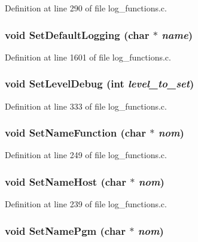 Definition at line 290 of file log\_\-functions.c.
\subsubsection[{SetDefaultLogging}]{\setlength{\rightskip}{0pt plus 5cm}void SetDefaultLogging (char $\ast$ {\em name})}\label{log__functions_8c_ad27b493349e9ab97cbbcc125fc8ea9d5}


Definition at line 1601 of file log\_\-functions.c.
\subsubsection[{SetLevelDebug}]{\setlength{\rightskip}{0pt plus 5cm}void SetLevelDebug (int {\em level\_\-to\_\-set})}\label{log__functions_8c_a61640e4aaca7a9df83a05849f6d001a9}


Definition at line 333 of file log\_\-functions.c.
\subsubsection[{SetNameFunction}]{\setlength{\rightskip}{0pt plus 5cm}void SetNameFunction (char $\ast$ {\em nom})}\label{log__functions_8c_aca6ef6a917e3178e7d309664cb668bec}


Definition at line 249 of file log\_\-functions.c.
\subsubsection[{SetNameHost}]{\setlength{\rightskip}{0pt plus 5cm}void SetNameHost (char $\ast$ {\em nom})}\label{log__functions_8c_af6eab31f9b059f44e3222af8d78cbd8b}


Definition at line 239 of file log\_\-functions.c.
\subsubsection[{SetNamePgm}]{\setlength{\rightskip}{0pt plus 5cm}void SetNamePgm (char $\ast$ {\em nom})}\label{log__functions_8c_a603806b370608a510a7db12cd482dc2a}


